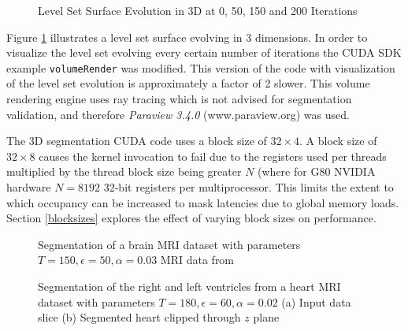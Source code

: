\begin{figure}[h]
  \begin{center}
  \end{center}
  \caption{Level Set Surface Evolution in 3D at 0, 50, 150 and 200 Iterations}
  \label{fig:evolution}
\end{figure}

Figure \ref{fig:evolution} illustrates a level set surface evolving in 3 dimensions. In order to visualize the level set evolving every certain number of iterations the CUDA SDK example \texttt{volumeRender} was modified. This version of the code with visualization of the level set evolution is approximately a factor of 2 slower. This volume rendering engine uses ray tracing which is not advised for segmentation validation, and therefore \textit{Paraview 3.4.0} (www.paraview.org) was used.

The 3D segmentation CUDA code uses a block size of $32 \times 4$. A block size of $32 \times 8$ causes the kernel invocation to fail due to the registers used per threads multiplied by the thread block size being greater $N$ (where for G80 NVIDIA hardware $N=8192$ 32-bit registers per multiprocessor. This limits the extent to which occupancy can be increased to mask latencies due to global memory loads. Section \ref{blocksizes} explores the effect of varying block sizes on performance.

\begin{figure}[p]
  \begin{center}
  \end{center}
  \caption{Segmentation of a brain MRI dataset with parameters $T = 150, \epsilon = 50, \alpha = 0.03$ MRI data from \cite{brainweb}}
  \label{fig:brain3d}
\end{figure}
\begin{figure}[p]
  \begin{center}
  \end{center}
  \caption{Segmentation of the right and left ventricles from a heart MRI dataset with parameters $T = 180, \epsilon = 60, \alpha = 0.02$ (a) Input data slice (b) Segmented heart clipped through $z$ plane}
  \label{fig:heart3d}
\end{figure}

